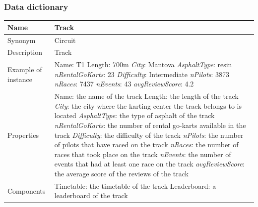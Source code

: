 \documentclass{beamer}
\begin{document}
\begin{frame}
\frametitle{Data dictionary}
\begin{table}
\tiny
\begin{tabular}{|p{2cm}|p{6cm}|}
\hline
Name & \textbf{Track} \\
\hline
Synonym & Circuit \\
\hline
Description & Track \\
\hline
Example of instance &
Name: T1 \newline
Length: 700m \newline
\textit{City}: Mantova \newline
\textit{AsphaltType}: resin \newline
\textit{nRentalGoKarts}: 23 \newline
\textit{Difficulty}: Intermediate \newline
\textit{nPilots}: 3873 \newline
\textit{nRaces}: 7437 \newline
\textit{nEvents}: 43 \newline
\textit{avgReviewScore}: 4.2 \\
\hline
Properties &
Name: the name of the track \newline
Length: the length of the track \newline
\textit{City}: the city where the karting center the track belongs to is located \newline
\textit{AsphaltType}: the type of asphalt of the track \newline
\textit{nRentalGoKarts}: the number of rental go-karts available in the track \newline
\textit{Difficulty}: the difficulty of the track \newline
\textit{nPilots}: the number of pilots that have raced on the track \newline
\textit{nRaces}: the number of races that took place on the track \newline
\textit{nEvents}: the number of events that had at least one race on the track \newline
\textit{avgReviewScore}: the average score of the reviews of the track \\
\hline
Components & 
Timetable: the timetable of the track \newline
Leaderboard: a leaderboard of the track \\
\hline
\end{tabular}
\end{table}
\end{frame}
\end{document}
